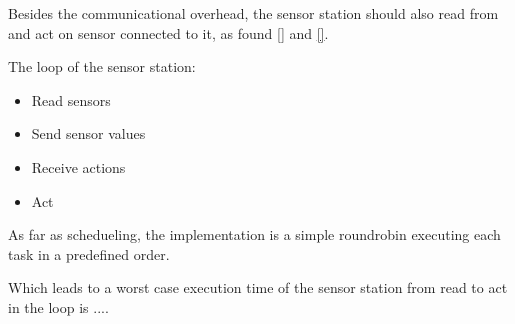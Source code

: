 Besides the communicational overhead, the sensor station should also read from and act on sensor connected to it,  as found \cref{} and \cref{}.

The loop of the sensor station:
\begin{itemize}
  \item Read sensors
  \item Send sensor values
  \item Receive actions
  \item Act
\end{itemize}

As far as schedueling, the implementation is a simple roundrobin executing each task in a predefined order.

Which leads to a worst case execution time of the sensor station from read to act in the loop is .... 
